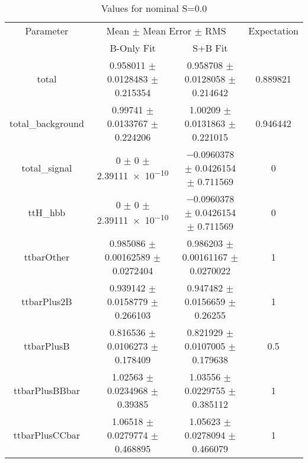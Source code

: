 \begin{table}
\centering
\caption{Values for nominal S=0.0}
\begin{tabular}{cccc}
\toprule
Parameter & \multicolumn{2}{c}{Mean $\pm$ Mean Error $\pm$ RMS} & Expectation\\
 & B-Only Fit & S+B Fit & \\
\midrule
total & \num{0.958011} $\pm$ \num{0.0128483} $\pm$ \num{0.215354} & \num{0.958708} $\pm$ \num{0.0128058} $\pm$ \num{0.214642} & \num{0.889821}\\
total\_background & \num{0.99741} $\pm$ \num{0.0133767} $\pm$ \num{0.224206} & \num{1.00209} $\pm$ \num{0.0131863} $\pm$ \num{0.221015} & \num{0.946442}\\
total\_signal & \num{0} $\pm$ \num{0} $\pm$ \num{2.39111e-10} & \num{-0.0960378} $\pm$ \num{0.0426154} $\pm$ \num{0.711569} & \num{0}\\
ttH\_hbb & \num{0} $\pm$ \num{0} $\pm$ \num{2.39111e-10} & \num{-0.0960378} $\pm$ \num{0.0426154} $\pm$ \num{0.711569} & \num{0}\\
ttbarOther & \num{0.985086} $\pm$ \num{0.00162589} $\pm$ \num{0.0272404} & \num{0.986203} $\pm$ \num{0.00161167} $\pm$ \num{0.0270022} & \num{1}\\
ttbarPlus2B & \num{0.939142} $\pm$ \num{0.0158779} $\pm$ \num{0.266103} & \num{0.947482} $\pm$ \num{0.0156659} $\pm$ \num{0.26255} & \num{1}\\
ttbarPlusB & \num{0.816536} $\pm$ \num{0.0106273} $\pm$ \num{0.178409} & \num{0.821929} $\pm$ \num{0.0107005} $\pm$ \num{0.179638} & \num{0.5}\\
ttbarPlusBBbar & \num{1.02563} $\pm$ \num{0.0234968} $\pm$ \num{0.39385} & \num{1.03556} $\pm$ \num{0.0229755} $\pm$ \num{0.385112} & \num{1}\\
ttbarPlusCCbar & \num{1.06518} $\pm$ \num{0.0279774} $\pm$ \num{0.468895} & \num{1.05623} $\pm$ \num{0.0278094} $\pm$ \num{0.466079} & \num{1}\\
\bottomrule
\end{tabular}
\end{table}